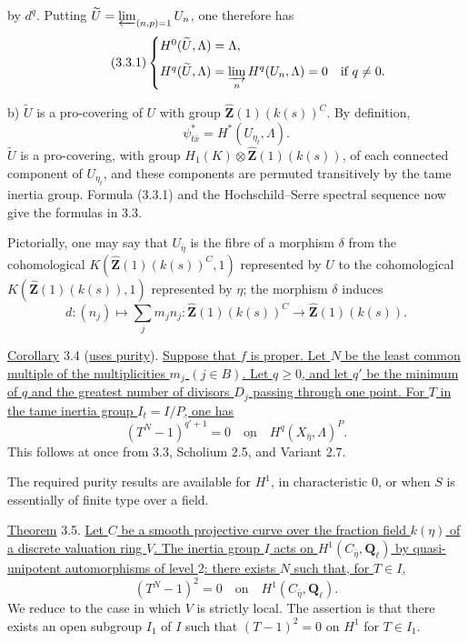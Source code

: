 
by $d^q$. Putting
$\widetilde U=\varprojlim_{(n,p)=1}U_n$, one therefore has
\begin{equation}\tag{3.3.1}
\begin{cases}
H^0(\widetilde U,\Lambda)=\Lambda,\\[6pt]
H^q(\widetilde U,\Lambda)=\displaystyle\varinjlim_n
  H^q(U_n,\Lambda)=0 & \text{if }q\ne0.
\end{cases}
\end{equation}

b) $\widetilde U$ is a pro-covering of $U$ with group
$\widehat{\mathbf Z}(1)(k(s))^C$. By definition,
\[
\psi^*_{t\bar x}=H^*(U_{\eta_t},\Lambda).
\]
$\widetilde U$ is a pro-covering, with group
$H_1(K)\otimes\widehat{\mathbf Z}(1)(k(s))$, of each connected component
of $U_{\eta_t}$, and these components are permuted transitively by the
tame inertia group. Formula (3.3.1) and the Hochschild--Serre spectral
sequence now give the formulas in 3.3.

Pictorially, one may say that $U_{\bar\eta}$ is the fibre of a morphism
$\delta$ from the cohomological
$K(\widehat{\mathbf Z}(1)(k(s))^C,1)$ represented by $U$ to the
cohomological $K(\widehat{\mathbf Z}(1)(k(s)),1)$ represented by $\eta$;
the morphism $\delta$ induces
\[
d:(n_j)\longmapsto\sum_jm_jn_j:
\widehat{\mathbf Z}(1)(k(s))^C
\longrightarrow\widehat{\mathbf Z}(1)(k(s)).
\]

\underline{Corollary} 3.4 (\underline{uses purity}). \underline{Suppose
that $f$ is proper. Let $N$ be the least common multiple of the
multiplicities $m_j$ $(j\in B)$. Let $q\geqslant0$, and let $q'$ be the
minimum of $q$ and the greatest number of divisors $D_j$ passing through
one point. For $T$ in the tame inertia group $I_t=I/P$, one has}
\begin{equation*}
(T^N-1)^{q'+1}=0
\quad\underline{\text{on}}\quad
H^q(X_{\bar\eta},\Lambda)^P.
\end{equation*}
This follows at once from 3.3, Scholium 2.5, and Variant 2.7.

The required purity results are available for $H^1$, in characteristic
$0$, or when $S$ is essentially of finite type over a field.

\underline{Theorem} 3.5. \underline{Let $C$ be a smooth projective curve
over the fraction field $k(\eta)$ of a discrete valuation ring $V$. The
inertia group $I$ acts on $H^1(C_{\bar\eta},\mathbf Q_\ell)$ by
quasi-unipotent automorphisms of level $2$: there exists $N$ such that,
for $T\in I$,}
\begin{equation*}
(T^N-1)^2=0
\quad\text{on}\quad H^1(C_{\bar\eta},\mathbf Q_\ell).
\end{equation*}
We reduce to the case in which $V$ is strictly local. The assertion is
that there exists an open subgroup $I_1$ of $I$ such that
$(T-1)^2=0$ on $H^1$ for $T\in I_1$.

